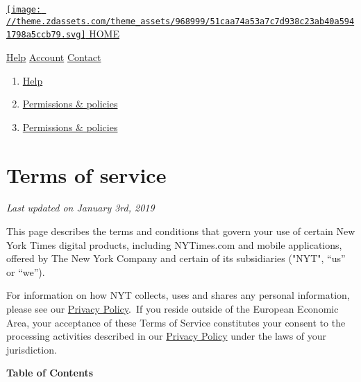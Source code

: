 \href{https://nytimes3xbfgragh.onion}{\texttt{[image: //theme.zdassets.com/theme\_assets/968999/51caa74a53a7c7d938c23ab40a5941798a5ccb79.svg]}
HOME}

\href{/hc/en-us}{Help} \textbar{}
\href{https://myaccount.nytimes3xbfgragh.onion/seg/}{Account} \textbar{}
\href{https://help.nytimes3xbfgragh.onion/hc/en-us/articles/115015385887-Contact-Us}{Contact}

\begin{enumerate}
\def\labelenumi{\arabic{enumi}.}
\tightlist
\item
  \href{/hc/en-us}{Help}
\item
  \href{/hc/en-us/categories/115001547468-Permissions-policies}{Permissions
  \& policies}
\item
  \href{/hc/en-us/sections/115002797688-Permissions-policies}{Permissions
  \& policies}
\end{enumerate}

\hypertarget{terms-of-service}{%
\section{Terms of service}\label{terms-of-service}}

\emph{Last updated on January 3rd, 2019}

This page describes the terms and conditions that govern your use of
certain New York Times digital products, including NYTimes.com and
mobile applications, offered by The New York Company and certain of its
subsidiaries ("NYT", ``us'' or ``we'').

For information on how NYT collects, uses and shares any personal
information, please see our
\href{https://help.nytimes3xbfgragh.onion/hc/en-us/articles/115014892108-Privacy-policy\%20}{Privacy
Policy}.~If you reside outside of the European Economic Area, your
acceptance of these Terms of Service constitutes your consent to the
processing activities described in our
\href{https://help.nytimes3xbfgragh.onion/hc/en-us/articles/115014892108-Privacy-policy}{Privacy
Policy} under the laws of your jurisdiction.

\textbf{Table of Contents}

